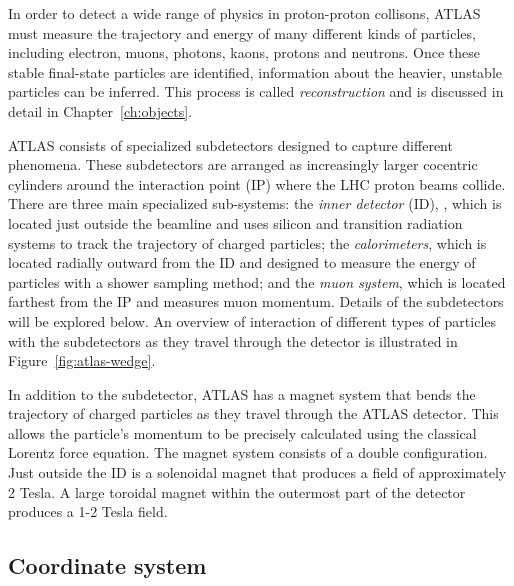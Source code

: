 In order to detect a wide range of physics in proton-proton collisons, ATLAS must measure the trajectory and energy of many different kinds of particles, including electron, muons, photons, kaons, protons and neutrons. Once these stable final-state particles are identified, information about the heavier, unstable particles can be inferred. This process is called \emph{reconstruction} and is discussed in detail in Chapter~\ref{ch:objects}.

ATLAS consists of specialized subdetectors designed to capture different phenomena. These subdetectors are arranged as increasingly larger cocentric cylinders around the interaction point (IP) where the LHC proton beams collide. There are three main specialized sub-systems: the \emph{inner detector} (ID),
, which is located just outside the beamline and uses silicon and transition radiation systems to track the trajectory of charged particles; the \emph{calorimeters}, which is located radially outward from the ID and designed to measure the energy of particles with a shower sampling method; and the \emph{muon system}, which is located farthest from the IP and measures muon momentum. Details of the subdetectors will be explored below. An overview of interaction of different types of particles with the subdetectors as they travel through the detector is illustrated in Figure~\ref{fig:atlas-wedge}.

In addition to the subdetector, ATLAS has a magnet system that bends the trajectory of charged particles as  they travel through the ATLAS detector. This allows the particle's momentum to be precisely calculated using the classical Lorentz force equation. The magnet system consists of a double configuration. Just outside the ID is a solenoidal magnet that produces a field of approximately 2 Tesla. A large toroidal magnet within the outermost part of the detector produces a 1-2 Tesla field.


\subsection{Coordinate system}



